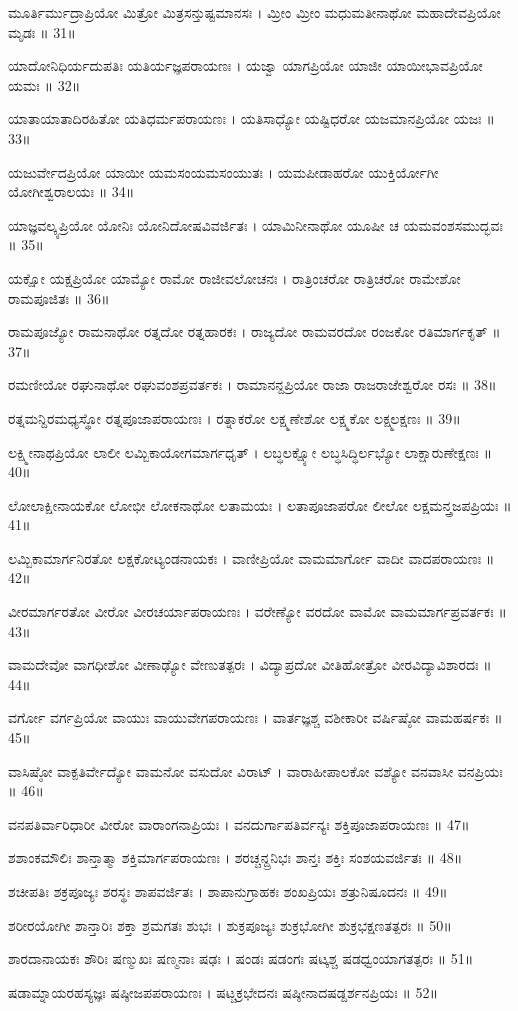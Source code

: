 ಮೂರ್ತಿರ್ಮುದ್ರಾಪ್ರಿಯೋ ಮಿತ್ರೋ ಮಿತ್ರಸನ್ತುಷ್ಟಮಾನಸಃ ।
ಮ್ರೀಂ ಮ್ರೀಂ ಮಧುಮತೀನಾಥೋ ಮಹಾದೇವಪ್ರಿಯೋ ಮೃಡಃ ॥ 31॥

ಯಾದೋನಿಧಿರ್ಯದುಪತಿಃ ಯತಿರ್ಯಜ್ಞಪರಾಯಣಃ ।
ಯಜ್ವಾ ಯಾಗಪ್ರಿಯೋ ಯಾಜೀ ಯಾಯೀಭಾವಪ್ರಿಯೋ ಯಮಃ ॥ 32॥

ಯಾತಾಯಾತಾದಿರಹಿತೋ ಯತಿಧರ್ಮಪರಾಯಣಃ ।
ಯತಿಸಾಧ್ಯೋ ಯಷ್ಟಿಧರೋ ಯಜಮಾನಪ್ರಿಯೋ ಯಜಃ ॥ 33॥

ಯಜುರ್ವೇದಪ್ರಿಯೋ ಯಾಯೀ ಯಮಸಂಯಮಸಂಯುತಃ ।
ಯಮಪೀಡಾಹರೋ ಯುಕ್ತಿರ್ಯೋಗೀ ಯೋಗೀಶ್ವರಾಲಯಃ ॥ 34॥

ಯಾಜ್ಞವಲ್ಕ್ಯಪ್ರಿಯೋ ಯೋನಿಃ ಯೋನಿದೋಷವಿವರ್ಜಿತಃ ।
ಯಾಮಿನೀನಾಥೋ ಯೂಷೀ ಚ ಯಮವಂಶಸಮುದ್ಭವಃ ॥ 35॥

ಯಕ್ಷೋ ಯಕ್ಷಪ್ರಿಯೋ ಯಾಮ್ಯೋ ರಾಮೋ ರಾಜೀವಲೋಚನಃ ।
ರಾತ್ರಿಂಚರೋ ರಾತ್ರಿಚರೋ ರಾಮೇಶೋ ರಾಮಪೂಜಿತಃ ॥ 36॥

ರಾಮಪೂಜ್ಯೋ ರಾಮನಾಥೋ ರತ್ನದೋ ರತ್ನಹಾರಕಃ ।
ರಾಜ್ಯದೋ ರಾಮವರದೋ ರಂಜಕೋ ರತಿಮಾರ್ಗಕೃತ್ ॥ 37॥

ರಮಣೀಯೋ ರಘುನಾಥೋ ರಘುವಂಶಪ್ರವರ್ತಕಃ ।
ರಾಮಾನನ್ದಪ್ರಿಯೋ ರಾಜಾ ರಾಜರಾಜೇಶ್ವರೋ ರಸಃ ॥ 38॥

ರತ್ನಮನ್ದಿರಮಧ್ಯಸ್ಥೋ ರತ್ನಪೂಜಾಪರಾಯಣಃ ।
ರತ್ನಾಕರೋ ಲಕ್ಷ್ಮಣೇಶೋ ಲಕ್ಷ್ಮಕೋ ಲಕ್ಷ್ಮಲಕ್ಷಣಃ ॥ 39॥

ಲಕ್ಷ್ಮೀನಾಥಪ್ರಿಯೋ ಲಾಲೀ ಲಮ್ಬಿಕಾಯೋಗಮಾರ್ಗಧೃತ್ ।
ಲಬ್ಧಲಕ್ಷ್ಯೋ ಲಬ್ಧಸಿದ್ಧಿರ್ಲಭ್ಯೋ ಲಾಕ್ಷಾರುಣೇಕ್ಷಣಃ ॥ 40॥

ಲೋಲಾಕ್ಷೀನಾಯಕೋ ಲೋಭೀ ಲೋಕನಾಥೋ ಲತಾಮಯಃ ।
ಲತಾಪೂಜಾಪರೋ ಲೀಲೋ ಲಕ್ಷಮನ್ತ್ರಜಪಪ್ರಿಯಃ ॥ 41॥

ಲಮ್ಬಿಕಾಮಾರ್ಗನಿರತೋ ಲಕ್ಷಕೋಟ್ಯಂಡನಾಯಕಃ ।
ವಾಣೀಪ್ರಿಯೋ ವಾಮಮಾರ್ಗೋ ವಾದೀ ವಾದಪರಾಯಣಃ ॥ 42॥

ವೀರಮಾರ್ಗರತೋ ವೀರೋ ವೀರಚರ್ಯಾಪರಾಯಣಃ ।
ವರೇಣ್ಯೋ ವರದೋ ವಾಮೋ ವಾಮಮಾರ್ಗಪ್ರವರ್ತಕಃ ॥ 43॥

ವಾಮದೇವೋ ವಾಗಧೀಶೋ ವೀಣಾಢ್ಯೋ ವೇಣುತತ್ಪರಃ ।
ವಿದ್ಯಾಪ್ರದೋ ವೀತಿಹೋತ್ರೋ ವೀರವಿದ್ಯಾವಿಶಾರದಃ ॥ 44॥

ವರ್ಗೋ ವರ್ಗಪ್ರಿಯೋ ವಾಯುಃ ವಾಯುವೇಗಪರಾಯಣಃ ।
ವಾರ್ತಜ್ಞಶ್ಚ ವಶೀಕಾರೀ ವರ್ಷಿಷ್ಠೋ ವಾಮಹರ್ಷಕಃ ॥ 45॥

ವಾಸಿಷ್ಠೋ ವಾಕ್ಪತಿರ್ವೇದ್ಯೋ ವಾಮನೋ ವಸುದೋ ವಿರಾಟ್ ।
ವಾರಾಹೀಪಾಲಕೋ ವಶ್ಯೋ ವನವಾಸೀ ವನಪ್ರಿಯಃ ॥ 46॥

ವನಪತಿರ್ವಾರಿಧಾರೀ ವೀರೋ ವಾರಾಂಗನಾಪ್ರಿಯಃ ।
ವನದುರ್ಗಾಪತಿರ್ವನ್ಯಃ ಶಕ್ತಿಪೂಜಾಪರಾಯಣಃ ॥ 47॥

ಶಶಾಂಕಮೌಲಿಃ ಶಾನ್ತಾತ್ಮಾ ಶಕ್ತಿಮಾರ್ಗಪರಾಯಣಃ ।
ಶರಚ್ಚನ್ದ್ರನಿಭಃ ಶಾನ್ತಃ ಶಕ್ತಿಃ ಸಂಶಯವರ್ಜಿತಃ ॥ 48॥

ಶಚೀಪತಿಃ ಶಕ್ರಪೂಜ್ಯಃ ಶರಸ್ಥಃ ಶಾಪವರ್ಜಿತಃ ।
ಶಾಪಾನುಗ್ರಾಹಕಃ ಶಂಖಪ್ರಿಯಃ ಶತ್ರುನಿಷೂದನಃ ॥ 49॥

ಶರೀರಯೋಗೀ ಶಾನ್ತಾರಿಃ ಶಕ್ತಾ ಶ್ರಮಗತಃ ಶುಭಃ ।
ಶುಕ್ರಪೂಜ್ಯಃ ಶುಕ್ರಭೋಗೀ ಶುಕ್ರಭಕ್ಷಣತತ್ಪರಃ ॥ 50॥

ಶಾರದಾನಾಯಕಃ ಶೌರಿಃ ಷಣ್ಮುಖಃ ಷಣ್ಮನಾಃ ಷಢಃ ।
ಷಂಡಃ ಷಡಂಗಃ ಷಟ್ಕಶ್ಚ ಷಡಧ್ವಂಯಾಗತತ್ಪರಃ ॥ 51॥

ಷಡಾಮ್ನಾಯರಹಸ್ಯಜ್ಞಃ ಷಷ್ಠೀಜಪಪರಾಯಣಃ ।
ಷಟ್ಚಕ್ರಭೇದನಃ ಷಷ್ಠೀನಾದಷಡ್ದರ್ಶನಪ್ರಿಯಃ ॥ 52॥

